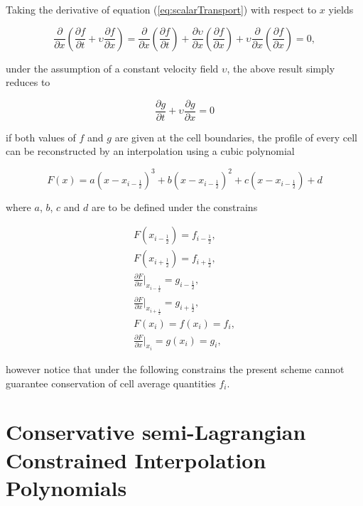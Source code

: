 \documentclass[10pt,a4paper]{article}
\newcommand{\pd}[2]{\frac{\partial #1}{\partial #2}}
\begin{document}
Taking the derivative of equation (\ref{eq:scalarTransport}) with respect to $x$ yields
%
\begin{linenomath}
\begin{equation}
	\pd{}{x}\left(\pd{f}{t} + \upsilon \pd{f}{x}\right) = 
	\pd{}{x}\left(\pd{f}{t} \right) + 
	\pd{\upsilon}{x} \left( \pd{f}{x} \right) + 
	\upsilon \pd{}{x} \left( \pd{f}{x} \right) = 0,
\end{equation}
\end{linenomath}
%
under the assumption of a constant velocity field $\upsilon$, the above result simply reduces to 
%
\begin{linenomath}
\begin{equation}
	\pd{g}{t} + \upsilon \pd{g}{x} = 0
	\label{eq:slopeTransport}
\end{equation}
\end{linenomath}
%
if both values of $f$ and $g$ are given at the cell boundaries, the profile of every cell can be reconstructed by an interpolation using a cubic polynomial 
%
\begin{linenomath}
\begin{equation}
	F(x) = a \left(x-x_{i-\frac{1}{2}} \right)^3 + 
		   b \left(x-x_{i-\frac{1}{2}} \right)^2 + 
		   c \left(x-x_{i-\frac{1}{2}} \right) + d
\end{equation}
\end{linenomath}
%
where $a$, $b$, $c$ and $d$ are to be defined under the constrains 
%
\begin{linenomath}
\begin{align}
	F(x_{i-\frac{1}{2}}) = f_{i-\frac{1}{2}}, \\
	F(x_{i+\frac{1}{2}}) = f_{i+\frac{1}{2}}, \\
	\pd{F}{x}|_{x_{i-\frac{1}{2}}} = g_{i-\frac{1}{2}}, \\
	\pd{F}{x}|_{x_{i+\frac{1}{2}}} = g_{i+\frac{1}{2}}, \\
	F(x_i) = f(x_i) = f_i, \\
	\pd{F}{x}|_{x_i} = g(x_i) = g_i,
\end{align}
\end{linenomath}
% 
however notice that under the following constrains the present scheme cannot guarantee conservation of cell average quantities $f_i$.

\section{Conservative semi-Lagrangian Constrained Interpolation Polynomials}
\label{sec:CIP-CSL}
\end{document}
